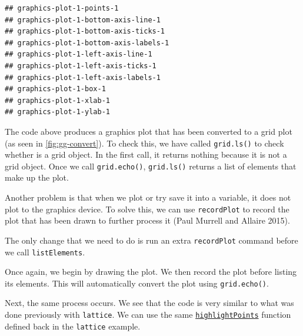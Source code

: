 \documentclass[11pt,]{report}
\newenvironment{Shaded}{\begin{snugshade}}{\end{snugshade}}
\newcommand{\KeywordTok}[1]{\textcolor[rgb]{0.13,0.29,0.53}{\textbf{#1}}}
\newcommand{\DataTypeTok}[1]{\textcolor[rgb]{0.13,0.29,0.53}{#1}}
\newcommand{\StringTok}[1]{\textcolor[rgb]{0.31,0.60,0.02}{#1}}
\newcommand{\OtherTok}[1]{\textcolor[rgb]{0.56,0.35,0.01}{#1}}
\newcommand{\OperatorTok}[1]{\textcolor[rgb]{0.81,0.36,0.00}{\textbf{#1}}}
\newcommand{\NormalTok}[1]{#1}
\begin{document}
\begin{verbatim}
## graphics-plot-1-points-1
## graphics-plot-1-bottom-axis-line-1
## graphics-plot-1-bottom-axis-ticks-1
## graphics-plot-1-bottom-axis-labels-1
## graphics-plot-1-left-axis-line-1
## graphics-plot-1-left-axis-ticks-1
## graphics-plot-1-left-axis-labels-1
## graphics-plot-1-box-1
## graphics-plot-1-xlab-1
## graphics-plot-1-ylab-1
\end{verbatim}

The code above produces a graphics plot that has been converted to a
grid plot (as seen in \autoref{fig:gg-convert}). To check this, we have
called \texttt{grid.ls()} to check whether is a grid object. In the
first call, it returns nothing because it is not a grid object. Once we
call \texttt{grid.echo()}, \texttt{grid.ls()} returns a list of elements
that make up the plot.

Another problem is that when we plot or try save it into a variable, it
does not plot to the graphics device. To solve this, we can use
\texttt{recordPlot} to record the plot that has been drawn to further
process it (Paul Murrell and Allaire 2015).

The only change that we need to do is run an extra \texttt{recordPlot}
command before we call \texttt{listElements}.

Once again, we begin by drawing the plot. We then record the plot before
listing its elements. This will automatically convert the plot using
\texttt{grid.echo()}.

\begin{Shaded}
\end{Shaded}

Next, the same process occurs. We see that the code is very similar to
what was done previously with \texttt{lattice}. We can use the same
\protect\hyperlink{highlightPoints}{\texttt{highlightPoints}} function
defined back in the \texttt{lattice} example.
\end{document}
